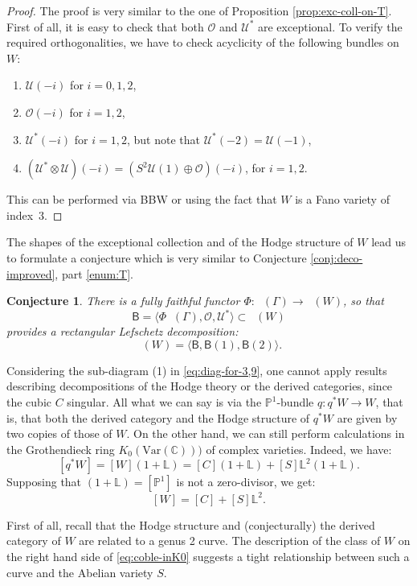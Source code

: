 \documentclass[11pt]{article}
\newcommand{\Var}{\mathrm{Var}}
\let\mathcal\mathscr
\theoremstyle{plain}
\newtheorem{conjecture}[theorem]{Conjecture}
\theoremstyle{definition}
\newcommand{\cat}[1]{\mathsf{#1}}
\newcommand{\sod}[1]{\langle #1 \rangle}
\DeclareMathOperator{\Db}{{\cat{D}^{\mathrm{b}}}}
\newcommand{\CC}{\mathbb{C}}
\newcommand{\LL}{\mathbb{L}}
\newcommand{\PP}{\mathbb{P}}
\newcommand{\sheaf}[1]{\mathcal{#1}}
\newcommand{\ko}{\sheaf{O}}\let\OO\ko\let\cO\ko
\newcommand{\ku}{\sheaf{U}}
\begin{document}
\begin{proof}
The proof is very similar to the one of Proposition \ref{prop:exc-coll-on-T}. First of all, it is easy to check
that both $\ko$ and $\ku^*$ are exceptional. To verify the required orthogonalities, we have to check
acyclicity of the following bundles on $W$:
\begin{enumerate}
\item $\ku(-i)$ for $i=0,1,2$,
\item $\ko(-i)$ for $i=1,2$,
\item $\ku^*(-i)$ for $i=1,2$, but note that $\ku^*(-2)=\ku(-1)$,
\item $(\ku^* \otimes \ku)(-i) = (S^2 \ku(1) \oplus \ko)(-i)$, for $i=1,2$.
\end{enumerate}
This can be performed via BBW or using the fact that $W$ is a Fano variety of index~$3$.
\end{proof}
The shapes of the exceptional collection and of the Hodge structure of $W$ lead us to formulate
a conjecture which is very similar to Conjecture \ref{conj:deco-improved}, part \eqref{enum:T}.

\begin{conjecture}\label{conj:deco-for-T29}
There is a fully faithful functor $\Phi: \Db(\Gamma) \to \Db(W)$, so that
\[
\cat{B}=\sod{\Phi \Db(\Gamma),\ko,\ku^*} \subset \Db(W)
\]
provides a rectangular Lefschetz decomposition:
\[
\Db(W)=\sod{\cat{B},\cat{B}(1),\cat{B}(2)}.
\]
\end{conjecture}

Considering the sub-diagram (1) in \eqref{eq:diag-for-3,9}, one cannot apply results describing decom\-positions of the
Hodge theory or the derived categories, since the cubic $C$ singular. All what we can say is via the
$\PP^1$-bundle $q: q^* W \to W$, that is, that both the derived category and the Hodge structure of $q^*W$
are given by two copies of those of $W$. On the other hand, we can still perform calculations in the
Grothendieck ring $K_0(\Var(\CC)))$ of complex varieties. Indeed, we have:
\[
[q^*W] = [W](1+\LL) = [C](1+\LL) + [S]\LL^2 (1+\LL).
\]
Supposing that $(1+\LL) = [\PP^1]$ is not a zero-divisor, we get:
\begin{equation}\label{eq:coble-inK0}
[W] = [C] + [S]\LL^2.
\end{equation}

First of all, recall that the Hodge structure and (conjecturally) the derived category
of $W$ are related to a genus 2 curve. The description of the class of $W$ on the right hand
side of \eqref{eq:coble-inK0} suggests a tight relationship between such a curve and the Abelian
variety $S$.
\end{document}
